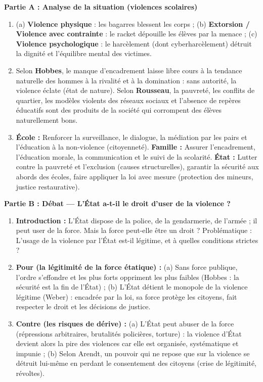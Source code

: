 \documentclass[11pt]{article}
\newcommand{\cle}[1]{{\popxbold\color{popdark}#1}}
\begin{document}
\begin{corrige}
\textbf{Partie A : Analyse de la situation (violences scolaires)}
\begin{enumerate}
\item (a) \textbf{Violence physique} : les bagarres blessent les corps ; (b) \textbf{Extorsion / Violence avec contrainte} : le racket dépouille les élèves par la menace ; (c) \textbf{Violence psychologique} : le harcèlement (dont cyberharcèlement) détruit la dignité et l'équilibre mental des victimes.
\item Selon \textbf{Hobbes}, le manque d'encadrement laisse libre cours à la tendance naturelle des hommes à la rivalité et à la domination : sans autorité, la violence éclate (état de nature). Selon \textbf{Rousseau}, la pauvreté, les conflits de quartier, les modèles violents des réseaux sociaux et l'absence de repères éducatifs sont des produits de la société qui corrompent des élèves naturellement bons.
\item \textbf{École :} Renforcer la surveillance, le dialogue, la médiation par les pairs et l'éducation à la non-violence (citoyenneté). \textbf{Famille :} Assurer l'encadrement, l'éducation morale, la communication et le suivi de la scolarité. \textbf{État :} Lutter contre la pauvreté et l'exclusion (causes structurelles), garantir la sécurité aux abords des écoles, faire appliquer la loi avec mesure (protection des mineurs, justice restaurative).
\end{enumerate}
\textbf{Partie B : Débat — L'État a-t-il le droit d'user de la violence ?}
\begin{enumerate}
\item \textbf{Introduction :} L'État dispose de la police, de la gendarmerie, de l'armée ; il peut user de la force. Mais la force peut-elle être un droit ? Problématique : L'usage de la violence par l'État est-il légitime, et à quelles conditions strictes ?
\item \textbf{Pour (la légitimité de la force étatique) :} (a) Sans force publique, l'ordre s'effondre et les plus forts oppriment les plus faibles (Hobbes : la sécurité est la fin de l'État) ; (b) L'État détient le \cle{monopole de la violence légitime} (Weber) : encadrée par la loi, sa force protège les citoyens, fait respecter le droit et les décisions de justice.
\item \textbf{Contre (les risques de dérive) :} (a) L'État peut abuser de la force (répressions arbitraires, brutalités policières, torture) : la violence d'État devient alors la pire des violences car elle est organisée, systématique et impunie ; (b) Selon Arendt, un pouvoir qui ne repose que sur la violence se détruit lui-même en perdant le consentement des citoyens (crise de légitimité, révoltes).

\end{enumerate}
\end{corrige}
\end{document}
